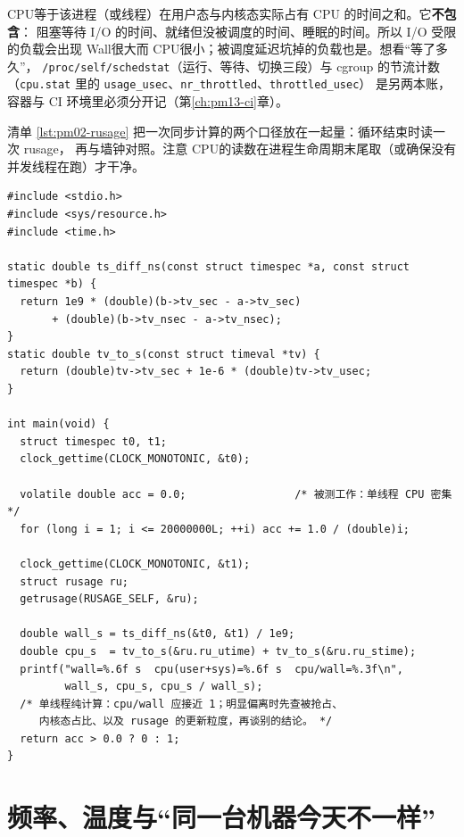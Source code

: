 \documentclass[12pt,a4paper,fontset=fandol]{ctexbook}
\newcommand{\Tp}[1]{\texttt{#1}}
\newcommand{\Bk}{\discretionary{}{}{}}
\newcommand{\Lang}[1]{\textsf{#1}}
\newcommand{\MWall}{\Lang{Wall}}
\newcommand{\MCpu}{\Lang{CPU}}
\begin{document}
\begin{note}[title={\MCpu 的定义，以及它不包含什么}]
\MCpu 等于该进程（或线程）在用户态与内核态实际占有 CPU 的时间之和。它\textbf{不包含}：
阻塞等待 I/O 的时间、就绪但没被调度的时间、睡眠的时间。所以 I/O 受限的负载会出现
\MWall 很大而 \MCpu 很小；被调度延迟坑掉的负载也是。想看``等了多久''，
\Tp{/proc{\Bk}/self{\Bk}/schedstat}（运行、等待、切换三段）与 cgroup 的节流计数
（\Tp{cpu.stat} 里的 \Tp{usage{\Bk}\_usec}、\Tp{nr{\Bk}\_throttled}、\Tp{throttled{\Bk}\_usec}）
是另两本账，容器与 CI 环境里必须分开记（第\ref{ch:pm13-ci}章）。
\end{note}

清单 \ref{lst:pm02-rusage} 把一次同步计算的两个口径放在一起量：循环结束时读一次 rusage，
再与墙钟对照。注意 \MCpu 的读数在进程生命周期末尾取（或确保没有并发线程在跑）才干净。

\begin{lstlisting}[style=cstyle, title={同一次运行同时量 \MWall 与 \MCpu（数值由你自己的机器给出）}, label={lst:pm02-rusage}]
#include <stdio.h>
#include <sys/resource.h>
#include <time.h>

static double ts_diff_ns(const struct timespec *a, const struct timespec *b) {
  return 1e9 * (double)(b->tv_sec - a->tv_sec)
       + (double)(b->tv_nsec - a->tv_nsec);
}
static double tv_to_s(const struct timeval *tv) {
  return (double)tv->tv_sec + 1e-6 * (double)tv->tv_usec;
}

int main(void) {
  struct timespec t0, t1;
  clock_gettime(CLOCK_MONOTONIC, &t0);

  volatile double acc = 0.0;                 /* 被测工作：单线程 CPU 密集 */
  for (long i = 1; i <= 20000000L; ++i) acc += 1.0 / (double)i;

  clock_gettime(CLOCK_MONOTONIC, &t1);
  struct rusage ru;
  getrusage(RUSAGE_SELF, &ru);

  double wall_s = ts_diff_ns(&t0, &t1) / 1e9;
  double cpu_s  = tv_to_s(&ru.ru_utime) + tv_to_s(&ru.ru_stime);
  printf("wall=%.6f s  cpu(user+sys)=%.6f s  cpu/wall=%.3f\n",
         wall_s, cpu_s, cpu_s / wall_s);
  /* 单线程纯计算：cpu/wall 应接近 1；明显偏离时先查被抢占、
     内核态占比、以及 rusage 的更新粒度，再谈别的结论。 */
  return acc > 0.0 ? 0 : 1;
}
\end{lstlisting}

\section{频率、温度与``同一台机器今天不一样''}
\label{sec:pm02-env}
\end{document}
